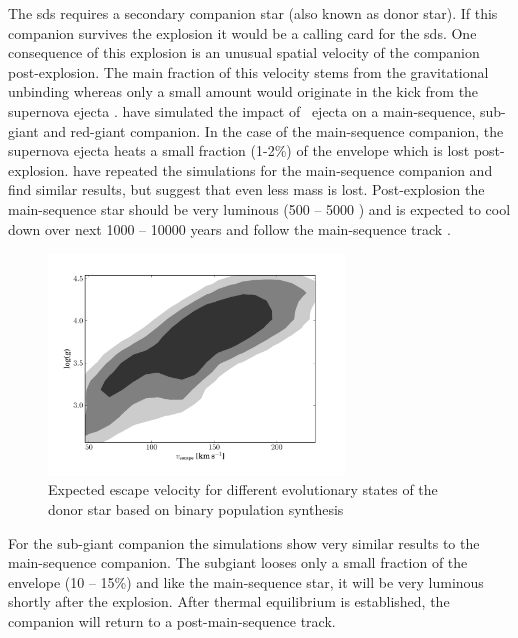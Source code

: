 The \gls{sds} requires a secondary companion star (also known as donor star). If this companion survives the explosion it would be a calling card for the \gls{sds}. One consequence of this explosion is an unusual spatial velocity of the companion post-explosion. The main fraction of this velocity stems from the gravitational unbinding whereas only a small amount would originate in the kick from the supernova ejecta \citep[see Figure \ref{fig:han2008_vrad};]{2001ApJ...550L..53C, han2008}. \citet{2000ApJS..128..615M} have simulated the impact of \snia\ ejecta on a main-sequence, sub-giant and red-giant companion. In the case of the main-sequence companion, the supernova ejecta heats a small fraction (1-2\%) of the envelope which is lost post-explosion. \citet{2008A&A...489..943P} have repeated the simulations for the main-sequence companion and find similar results, but suggest that even less mass is lost. Post-explosion the main-sequence star should be very luminous (500 -- 5000 \lsun) and is expected to cool down over next 1000 -- 10000 years and follow the main-sequence track  \citep{2000ApJS..128..615M}. 

\begin{figure}[htbp] %
   \centering
   \includegraphics[width=0.7\textwidth]{chapter_intro/plots/theo_vrad.pdf} 
   \caption[Expected escape velocities for donor stars]{Expected escape velocity for different evolutionary states of the donor star based on binary population synthesis \citep[][data kindly provided by Z. Han]{2008ApJ...677L.109H} }
   \label{fig:han2008_vrad}
\end{figure}

For the sub-giant companion the simulations show very similar results to the main-sequence companion. The subgiant looses only a small fraction of the envelope (10 -- 15\%) and like the main-sequence star, it will be very luminous shortly after the explosion. After thermal equilibrium is established, the companion will return to a post-main-sequence track. 

